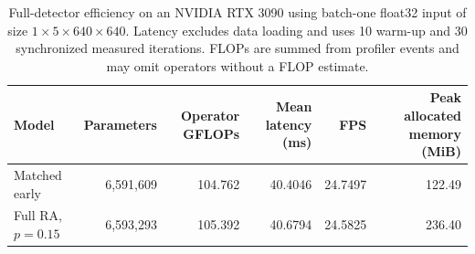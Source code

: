 \begin{table}[t]
\caption{Full-detector efficiency on an NVIDIA RTX 3090 using batch-one float32 input of size $1\times5\times640\times640$. Latency excludes data loading and uses 10 warm-up and 30 synchronized measured iterations. FLOPs are summed from profiler events and may omit operators without a FLOP estimate.}
\label{tab:v49-efficiency-profile}
\centering
\small
\begin{tabular}{lrrrrr}
\toprule
Model & Parameters & Operator GFLOPs & Mean latency (ms) & FPS & Peak allocated memory (MiB) \\
\midrule
Matched early & 6,591,609 & 104.762 & 40.4046 & 24.7497 & 122.49 \\
Full RA, $p=0.15$ & 6,593,293 & 105.392 & 40.6794 & 24.5825 & 236.40 \\
\bottomrule
\end{tabular}
\end{table}

